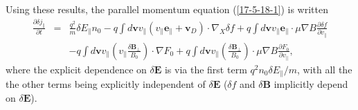 \documentclass{article}
\begin{document}
Using these results, the parallel momentum equation (\ref{17-5-18-1}) is
written
\begin{eqnarray}
  \frac{\partial \delta j_{\parallel}}{\partial t} & = & \frac{q^2}{m} \delta
  E_{\parallel} n_0 - q \int d\mathbf{v}v_{\parallel} (v_{\parallel}
  \mathbf{e}_{\parallel} +\mathbf{v}_D) \cdot \nabla_X \delta f + q \int
  d\mathbf{v}v_{\parallel} \mathbf{e}_{\parallel} \cdot \mu \nabla B
  \frac{\partial \delta f}{\partial v_{\parallel}} \nonumber\\
  &  & - q \int d\mathbf{v}v_{\parallel} \left( v_{\parallel} \frac{\delta
  \mathbf{B}_{\perp}}{B_0} \right) \cdot \nabla F_0 + q \int
  d\mathbf{v}v_{\parallel} \left( \frac{\delta \mathbf{B}_{\perp}}{B_0}
  \right) \cdot \mu \nabla B \frac{\partial F_0}{\partial v_{\parallel}}, 
  \label{17-5-18-p3}
\end{eqnarray}
where the explicit dependence on $\delta \mathbf{E}$ is via the first term
$q^2 n_0 \delta E_{\parallel} / m$, with all the the other terms being
explicitly independent of $\delta \mathbf{E}$ ($\delta f$ and $\delta
\mathbf{B}$ implicitly depend on $\delta \mathbf{E}$).
\end{document}
